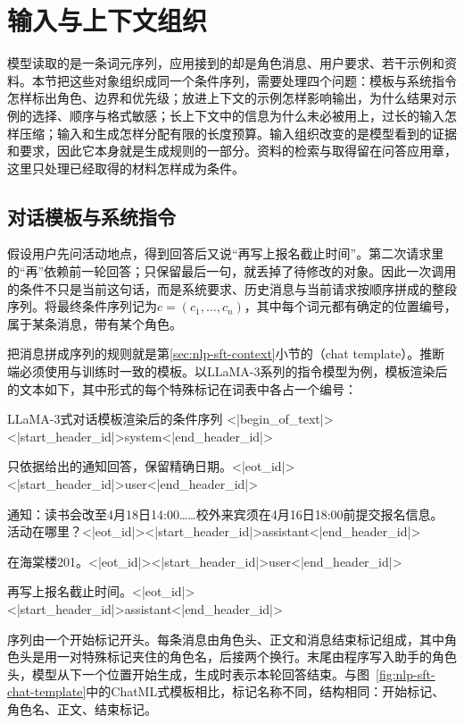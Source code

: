 \section{输入与上下文组织}
\label{sec:nlp-inference-context}

模型读取的是一条词元序列，应用接到的却是角色消息、用户要求、若干示例和资料。本节把这些对象组织成同一个条件序列，需要处理四个问题：模板与系统指令怎样标出角色、边界和优先级；放进上下文的示例怎样影响输出，为什么结果对示例的选择、顺序与格式敏感；长上下文中的信息为什么未必被用上，过长的输入怎样压缩；输入和生成怎样分配有限的长度预算。输入组织改变的是模型看到的证据和要求，因此它本身就是生成规则的一部分。资料的检索与取得留在问答应用章，这里只处理已经取得的材料怎样成为条件。

\subsection{对话模板与系统指令}
\label{sec:nlp-inference-dialogue}

假设用户先问活动地点，得到回答后又说“再写上报名截止时间”。第二次请求里的“再”依赖前一轮回答；只保留最后一句，就丢掉了待修改的对象。因此一次调用的条件不只是当前这句话，而是系统要求、历史消息与当前请求按顺序拼成的整段序列。将最终条件序列记为$c=(c_1,\ldots,c_n)$，其中每个词元都有确定的位置编号，属于某条消息，带有某个角色。

把消息拼成序列的规则就是第\ref{sec:nlp-sft-context}小节的（chat template）。推断端必须使用与训练时一致的模板。以LLaMA-3系列的指令模型为例，模板渲染后的文本如下，其中形式的每个特殊标记在词表中各占一个编号：

\begin{codeblock}[label={code:nlp-inference-llama3-template}]{LLaMA-3式对话模板渲染后的条件序列}
<|begin_of_text|><|start_header_id|>system<|end_header_id|>

只依据给出的通知回答，保留精确日期。<|eot_id|><|start_header_id|>user<|end_header_id|>

通知：读书会改至4月18日14:00……校外来宾须在4月16日18:00前提交报名信息。
活动在哪里？<|eot_id|><|start_header_id|>assistant<|end_header_id|>

在海棠楼201。<|eot_id|><|start_header_id|>user<|end_header_id|>

再写上报名截止时间。<|eot_id|><|start_header_id|>assistant<|end_header_id|>

\end{codeblock}

序列由一个开始标记开头。每条消息由角色头、正文和消息结束标记组成，其中角色头是用一对特殊标记夹住的角色名，后接两个换行。末尾由程序写入助手的角色头，模型从下一个位置开始生成，生成时表示本轮回答结束。与图~\ref{fig:nlp-sft-chat-template}中的ChatML式模板相比，标记名称不同，结构相同：开始标记、角色名、正文、结束标记。

